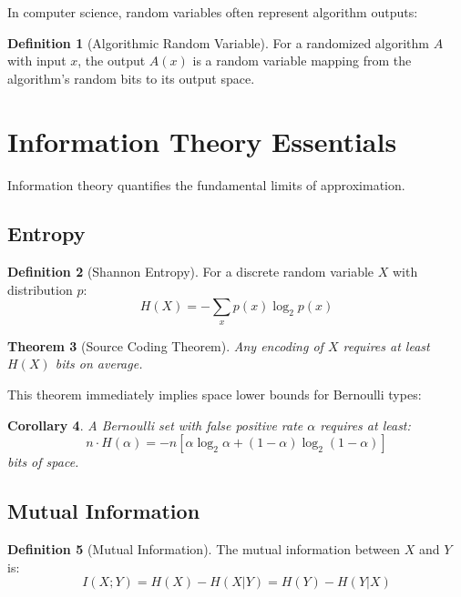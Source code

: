 \documentclass[11pt,twoside,openright]{book}
\theoremstyle{definition}
\newtheorem{definition}{Definition}[chapter]
\theoremstyle{plain}
\newtheorem{theorem}[definition]{Theorem}
\newtheorem{corollary}[definition]{Corollary}
\theoremstyle{remark}
\begin{document}
In computer science, random variables often represent algorithm outputs:

\begin{definition}[Algorithmic Random Variable]
For a randomized algorithm $A$ with input $x$, the output $A(x)$ is a random variable mapping from the algorithm's random bits to its output space.
\end{definition}

\section{Information Theory Essentials}

Information theory quantifies the fundamental limits of approximation.

\subsection{Entropy}

\begin{definition}[Shannon Entropy]
For a discrete random variable $X$ with distribution $p$:
\begin{equation}
H(X) = -\sum_{x} p(x) \log_2 p(x)
\end{equation}
\end{definition}

\begin{theorem}[Source Coding Theorem]
Any encoding of $X$ requires at least $H(X)$ bits on average.
\end{theorem}

This theorem immediately implies space lower bounds for Bernoulli types:

\begin{corollary}
A Bernoulli set with false positive rate $\alpha$ requires at least:
\begin{equation}
n \cdot H(\alpha) = -n[\alpha \log_2 \alpha + (1-\alpha) \log_2(1-\alpha)]
\end{equation}
bits of space.
\end{corollary}

\subsection{Mutual Information}

\begin{definition}[Mutual Information]
The mutual information between $X$ and $Y$ is:
\begin{equation}
I(X; Y) = H(X) - H(X|Y) = H(Y) - H(Y|X)
\end{equation}
\end{definition}
\end{document}
